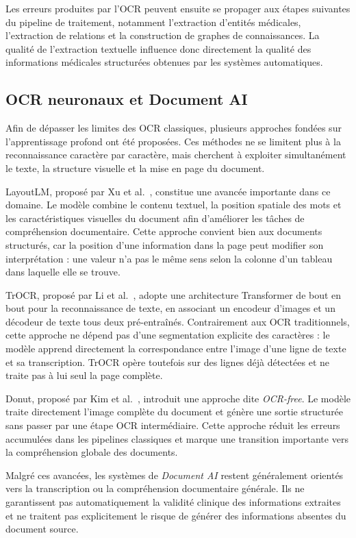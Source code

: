 Les erreurs produites par l'OCR peuvent ensuite se propager aux étapes suivantes du pipeline de traitement, notamment l'extraction d'entités médicales, l'extraction de relations et la construction de graphes de connaissances. La qualité de l'extraction textuelle influence donc directement la qualité des informations médicales structurées obtenues par les systèmes automatiques.

\subsection{OCR neuronaux et Document AI}

Afin de dépasser les limites des OCR classiques, plusieurs approches fondées sur l'apprentissage profond ont été proposées. Ces méthodes ne se limitent plus à la reconnaissance caractère par caractère, mais cherchent à exploiter simultanément le texte, la structure visuelle et la mise en page du document.

LayoutLM, proposé par Xu et al.~\cite{xu2020layoutlm}, constitue une avancée importante dans ce domaine. Le modèle combine le contenu textuel, la position spatiale des mots et les caractéristiques visuelles du document afin d'améliorer les tâches de compréhension documentaire. Cette approche convient bien aux documents structurés, car la position d'une information dans la page peut modifier son interprétation : une valeur n'a pas le même sens selon la colonne d'un tableau dans laquelle elle se trouve.

TrOCR, proposé par Li et al.~\cite{li2023trocr}, adopte une architecture Transformer de bout en bout pour la reconnaissance de texte, en associant un encodeur d'images et un décodeur de texte tous deux pré-entraînés. Contrairement aux OCR traditionnels, cette approche ne dépend pas d'une segmentation explicite des caractères : le modèle apprend directement la correspondance entre l'image d'une ligne de texte et sa transcription. TrOCR opère toutefois sur des lignes déjà détectées et ne traite pas à lui seul la page complète.

Donut, proposé par Kim et al.~\cite{kim2022donut}, introduit une approche dite \textit{OCR-free}. Le modèle traite directement l'image complète du document et génère une sortie structurée sans passer par une étape OCR intermédiaire. Cette approche réduit les erreurs accumulées dans les pipelines classiques et marque une transition importante vers la compréhension globale des documents.

Malgré ces avancées, les systèmes de \textit{Document AI} restent généralement orientés vers la transcription ou la compréhension documentaire générale. Ils ne garantissent pas automatiquement la validité clinique des informations extraites et ne traitent pas explicitement le risque de générer des informations absentes du document source.

